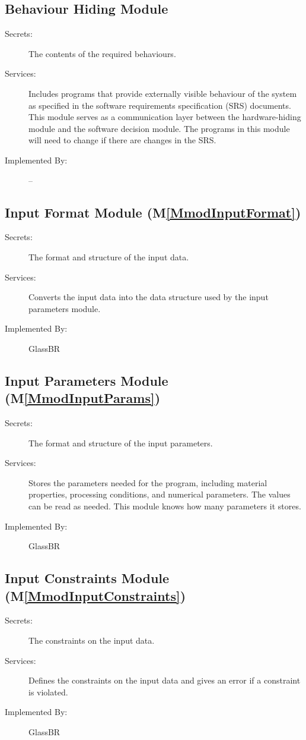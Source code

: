 \documentclass[12pt]{article}
\begin{document}
\subsection{Behaviour Hiding Module}
\label{Sec:BehaHidiModu}
\begin{description}
\item[Secrets:]The contents of the required behaviours.
\item[Services:]Includes programs that provide externally visible behaviour of the system as specified in the software requirements specification (SRS) documents. This module serves as a communication layer between the hardware-hiding module and the software decision module. The programs in this module will need to change if there are changes in the SRS.
\item[Implemented By:]--
\end{description}
\subsection{Input Format Module (M\ref{MmodInputFormat})}
\label{Sec:InpuFormModu()}
\begin{description}
\item[Secrets:]The format and structure of the input data.
\item[Services:]Converts the input data into the data structure used by the input parameters module.
\item[Implemented By:]GlassBR
\end{description}
\subsection{Input Parameters Module (M\ref{MmodInputParams})}
\label{Sec:InpuParaModu()}
\begin{description}
\item[Secrets:]The format and structure of the input parameters.
\item[Services:]Stores the parameters needed for the program, including material properties, processing conditions, and numerical parameters. The values can be read as needed. This module knows how many parameters it stores.
\item[Implemented By:]GlassBR
\end{description}
\subsection{Input Constraints Module (M\ref{MmodInputConstraints})}
\label{Sec:InpuConsModu()}
\begin{description}
\item[Secrets:]The constraints on the input data.
\item[Services:]Defines the constraints on the input data and gives an error if a constraint is violated.
\item[Implemented By:]GlassBR
\end{description}
\end{document}
